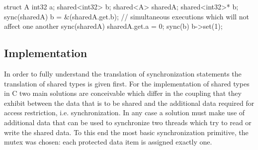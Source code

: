 \begin{ccode}
struct A {
  int32 a;
  shared<int32> b; 
}
shared<A> sharedA;
shared<int32>* b;
sync(sharedA) { b = &(sharedA.get.b); }
// simultaneous executions which will not affect one another
sync(sharedA) { sharedA.get.a = 0; }   sync(b) { b->set(1); }
\end{ccode}


\subsection{Implementation}
In order to fully understand the translation of synchronization statements the translation of shared types is given first. For the implementation of shared types in C two main solutions are conceivable which differ in the coupling that they exhibit between the data that is to be shared and the additional data required for access restriction, i.e. synchronization. In any case a solution must make use of additional data that can be used to synchronize two threads which try to read or write the shared data. To this end the most basic synchronization primitive, the mutex was chosen: each protected data item is assigned exactly one. 

